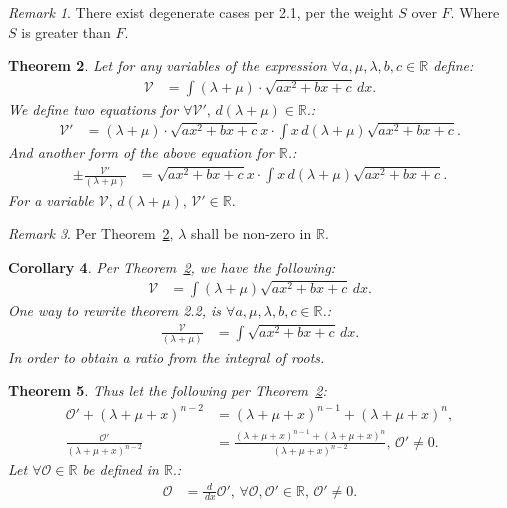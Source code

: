 \documentclass[10pt]{article}
\theoremstyle{plain}
\newtheorem{theorem}{Theorem}[section]
\newtheorem{corollary}[theorem]{Corollary}
\theoremstyle{definition}
\theoremstyle{remark}
\newtheorem{remark}[theorem]{Remark}
\begin{document}
\begin{remark}
	There exist degenerate cases per 2.1, per the weight $S$ over $F$. Where $S$ is greater than $F$.
\end{remark}

\begin{theorem}
\label{theo:expr-int}
	Let for any variables of the expression $\forall a, \mu, \lambda, b, c \in \mathbb{R}$ define:
	\begin{align*}
		\mathcal{V} &= \int (\lambda + \mu) \cdot \sqrt{ax^2 + bx + c} \, dx.
	\end{align*}
	We define two equations for $\forall \mathcal{V}', \, d(\lambda + \mu) \in \mathbb{R}.$:
	\begin{align*}
		\mathcal{V}' &= (\lambda + \mu) \cdot  \sqrt{ax^2 + bx + c}x \cdot  \int x \, d(\lambda + \mu)\sqrt{ax^2 + bx  +c}.
	\end{align*}
	And another form of the above equation for $\mathbb{R}$.:
	\begin{align*}
		\pm \frac{\mathcal{V}'}{(\lambda + \mu)} &= \sqrt{ax^2 + bx + c}x \cdot  \int x \, d(\lambda + \mu)\sqrt{ax^2 + bx  +c}.
	\end{align*}
	For a variable $\mathcal{V}, \, d(\lambda + \mu), \, \mathcal{V}' \in \mathbb{R}.$
\end{theorem}

\begin{remark}
	Per Theorem~\ref{theo:expr-int}, $\lambda$ shall be non-zero in $\mathbb{R}.$
\end{remark}

\begin{corollary}
	Per Theorem~\ref{theo:expr-int}, we have the following:
	\begin{align*}
		\mathcal{V} &= \int (\lambda + \mu)\sqrt{ax^2 + bx + c} \, dx.
	\end{align*}
	One way to rewrite theorem 2.2, is $\forall a, \mu, \lambda, b, c \in \mathbb{R}$.:
	\begin{align*}
		\frac{\mathcal{V}}{(\lambda + \mu)} &= \int \sqrt{ax^2 + bx + c} \, dx.
	\end{align*}
	In order to obtain a ratio from the integral of roots.
\end{corollary}

\begin{theorem}
	Thus let the following per Theorem~\ref{theo:expr-int}:
	\begin{align*}
		\mathcal{O}' + (\lambda + \mu + x)^{n-2} &= (\lambda + \mu + x)^{n-1} + (\lambda + \mu + x)^{n},\\
		\frac{\mathcal{O}'}{(\lambda + \mu + x)^{n-2}} &= \frac{(\lambda + \mu + x)^{n-1} + (\lambda + \mu + x)^{n}}{(\lambda + \mu + x)^{n-2}}, \, \mathcal{O}' \neq 0.
	\end{align*}
	Let $\forall \mathcal{O} \in \mathbb{R}$ be defined in $\mathbb{R}.$:
	\begin{align*}
		\mathcal{O} &= \frac{d}{\, dx} \mathcal{O}', \, \forall \mathcal{O}, \mathcal{O}' \in \mathbb{R}, \, \mathcal{O}' \neq 0.
	\end{align*}
\end{theorem}
\end{document}

